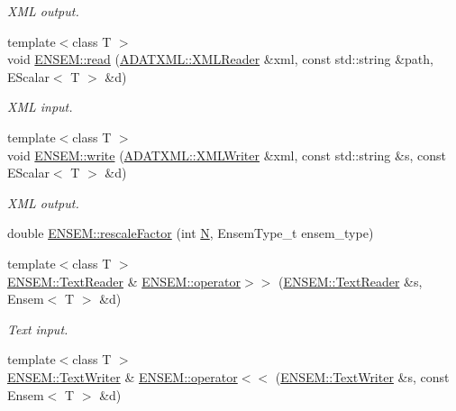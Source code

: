 \begin{DoxyCompactItemize}
\begin{DoxyCompactList}\small\item\em X\+ML output. \end{DoxyCompactList}\item 
{\footnotesize template$<$class T $>$ }\\void \mbox{\hyperlink{group__escalar_ga5631206e233cf75b5fb2ff13ee8b77ac}{E\+N\+S\+E\+M\+::read}} (\mbox{\hyperlink{classADATXML_1_1XMLReader}{A\+D\+A\+T\+X\+M\+L\+::\+X\+M\+L\+Reader}} \&xml, const std\+::string \&path, E\+Scalar$<$ T $>$ \&d)
\begin{DoxyCompactList}\small\item\em X\+ML input. \end{DoxyCompactList}\item 
{\footnotesize template$<$class T $>$ }\\void \mbox{\hyperlink{group__escalar_ga2e7afe18081ed96c569177362d6bb43d}{E\+N\+S\+E\+M\+::write}} (\mbox{\hyperlink{classADATXML_1_1XMLWriter}{A\+D\+A\+T\+X\+M\+L\+::\+X\+M\+L\+Writer}} \&xml, const std\+::string \&s, const E\+Scalar$<$ T $>$ \&d)
\begin{DoxyCompactList}\small\item\em X\+ML output. \end{DoxyCompactList}\item 
double \mbox{\hyperlink{group__eensem_ga01418f9a0c64b71fae7f8d400a68f25e}{E\+N\+S\+E\+M\+::rescale\+Factor}} (int \mbox{\hyperlink{adat__devel_2lib_2hadron_2operator__name__util_8cc_a7722c8ecbb62d99aee7ce68b1752f337}{N}}, Ensem\+Type\+\_\+t ensem\+\_\+type)
\item 
{\footnotesize template$<$class T $>$ }\\\mbox{\hyperlink{classENSEM_1_1TextReader}{E\+N\+S\+E\+M\+::\+Text\+Reader}} \& \mbox{\hyperlink{group__eensem_ga607184316d75a7cc8f6e0b082332832e}{E\+N\+S\+E\+M\+::operator$>$$>$}} (\mbox{\hyperlink{classENSEM_1_1TextReader}{E\+N\+S\+E\+M\+::\+Text\+Reader}} \&s, Ensem$<$ T $>$ \&d)
\begin{DoxyCompactList}\small\item\em Text input. \end{DoxyCompactList}\item 
{\footnotesize template$<$class T $>$ }\\\mbox{\hyperlink{classENSEM_1_1TextWriter}{E\+N\+S\+E\+M\+::\+Text\+Writer}} \& \mbox{\hyperlink{group__eensem_ga6ec953adfd003a66dd85074b0e1ad399}{E\+N\+S\+E\+M\+::operator$<$$<$}} (\mbox{\hyperlink{classENSEM_1_1TextWriter}{E\+N\+S\+E\+M\+::\+Text\+Writer}} \&s, const Ensem$<$ T $>$ \&d)

\end{DoxyCompactItemize}
